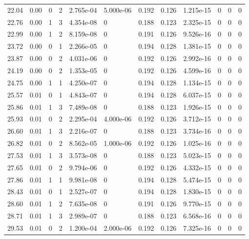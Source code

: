 \documentclass[preview]{standalone}
\begin{document}
{{{\begin{tabular}{L{1.2cm}C{1.2cm} C{0.3cm}C{0.5cm} C{1.4cm}C{1.4cm} C{1.4cm}C{1.4cm} C{1.6cm}C{1.6cm} C{1.6cm}C{1.6cm}}
  22.04  &  0.00  & 0     &  2 &  2.765e-04  & 5.000e-06  &  0.192&   0.126& 1.215e-15 & 0   &  0 & 0  \\ 
  22.76  &  0.00  & 1     &  3 &  4.354e-08  & 0  &  0.188&   0.123& 2.325e-15 & 0   &  0 & 0  \\ 
  22.99  &  0.00  & 1     &  2 &  8.159e-08  & 0  &  0.191&   0.126& 9.526e-16 & 0   &  0 & 0  \\ 
  23.72  &  0.00  & 0     &  1 &  2.266e-05  & 0  &  0.194&   0.128& 1.381e-15 & 0   &  0 & 0  \\ 
  23.87  &  0.00  & 0     &  2 &  4.031e-06  & 0  &  0.192&   0.126& 2.992e-16 & 0   &  0 & 0  \\ 
  24.19  &  0.00  & 0     &  2 &  1.353e-05  & 0  &  0.192&   0.126& 4.599e-16 & 0   &  0 & 0  \\ 
  24.75  &  0.00  & 1     &  1 &  4.250e-07  & 0  &  0.194&   0.128& 1.134e-15 & 0   &  0 & 0  \\ 
  25.57  &  0.01  & 0     &  1 &  4.843e-07  & 0  &  0.194&   0.128& 6.037e-15 & 0   &  0 & 0  \\ 
  25.86  &  0.01  & 1     &  3 &  7.489e-08  & 0  &  0.188&   0.123& 1.926e-15 & 0   &  0 & 0  \\ 
  25.93  &  0.01  & 0     &  2 &  2.295e-04  & 4.000e-06  &  0.192&   0.126& 3.712e-15 & 0   &  0 & 0  \\ 
  26.60  &  0.01  & 1     &  3 &  2.216e-07  & 0  &  0.188&   0.123& 3.734e-16 & 0   &  0 & 0  \\ 
  26.82  &  0.01  & 0     &  2 &  8.562e-05  & 1.000e-06  &  0.192&   0.126& 1.025e-16 & 0   &  0 & 0  \\ 
  27.53  &  0.01  & 1     &  3 &  3.573e-08  & 0  &  0.188&   0.123& 5.023e-15 & 0   &  0 & 0  \\ 
  27.65  &  0.01  & 0     &  2 &  9.794e-06  & 0  &  0.192&   0.126& 4.332e-15 & 0   &  0 & 0  \\ 
  27.86  &  0.01  & 1     &  1 &  9.981e-08  & 0  &  0.194&   0.128& 5.474e-15 & 0   &  0 & 0  \\ 
  28.43  &  0.01  & 0     &  1 &  2.527e-07  & 0  &  0.194&   0.128& 1.830e-15 & 0   &  0 & 0  \\ 
  28.60  &  0.01  & 1     &  2 &  7.635e-08  & 0  &  0.191&   0.126& 9.770e-15 & 0   &  0 & 0  \\ 
  28.71  &  0.01  & 1     &  3 &  2.989e-07  & 0  &  0.188&   0.123& 6.568e-16 & 0   &  0 & 0  \\ 
  29.53  &  0.01  & 0     &  2 &  1.200e-04  & 2.000e-06  &  0.192&   0.126& 7.325e-16 & 0   &  0 & 0  \\ 

\end{tabular}}}}
\end{document}
